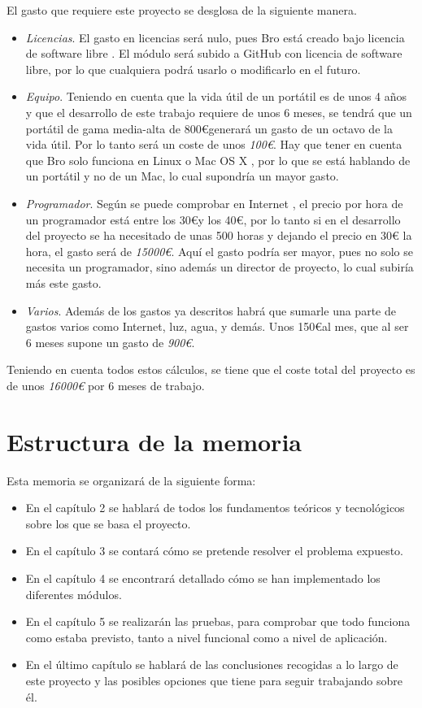 El gasto que requiere este proyecto se desglosa de la siguiente manera.
\begin{itemize}
\item \textit{Licencias}. El gasto en licencias será nulo, pues Bro está creado bajo licencia de software libre \cite{broindex}. El 
módulo será subido a GitHub \cite{repo} con licencia de software libre, por lo que cualquiera podrá usarlo o modificarlo en el futuro.
\item \textit{Equipo}. Teniendo en cuenta que la vida útil de un portátil es de unos 4 años y que el desarrollo de este trabajo 
requiere de unos 6 meses, se tendrá que un portátil de gama media-alta de 800\euro generará un gasto de un octavo de la vida útil. Por 
lo tanto será un coste de unos \textit{100\euro}. Hay que tener en cuenta que Bro solo funciona en Linux o Mac OS X 
\cite{brodownload}, por lo que se está hablando de un portátil y no de un Mac, lo cual supondría un mayor gasto.
\item \textit{Programador}. Según se puede comprobar en Internet \cite{tarifa}, el precio por hora de un programador está entre los 
30\euro y los 40\euro, por lo tanto si en el desarrollo del proyecto se ha necesitado de unas 500 horas y dejando el precio en 30\euro 
la hora, el gasto será de \textit{15000\euro}. Aquí el gasto podría ser mayor, pues no solo se necesita un programador, sino además un 
director de proyecto, lo cual subiría más este gasto.
\item \textit{Varios}. Además de los gastos ya descritos habrá que sumarle una parte de gastos varios como Internet, luz, agua, y 
demás. Unos 150\euro al mes, que al ser 6 meses supone un gasto de \textit{900\euro}.
\end{itemize}

\intro Teniendo en cuenta todos estos cálculos, se tiene que el coste total del proyecto es de unos \textit{16000\euro} por 6 meses de 
trabajo.

\section{Estructura de la memoria}

Esta memoria se organizará de la siguiente forma: 
\begin{itemize}
\item En el capítulo 2 se hablará de todos los fundamentos teóricos y tecnológicos sobre los que se 
basa el proyecto.
\item En el capítulo 3 se contará cómo se pretende resolver el problema expuesto.
\item En el capítulo 4 se encontrará detallado cómo se han implementado los diferentes módulos.
\item En el capítulo 5 se realizarán las pruebas, para comprobar que todo funciona como 
estaba previsto, tanto a nivel funcional como a nivel de aplicación.
\item En el último capítulo se hablará de las conclusiones recogidas a lo largo de este proyecto y las posibles 
opciones que tiene para seguir trabajando sobre él.
\end{itemize}
